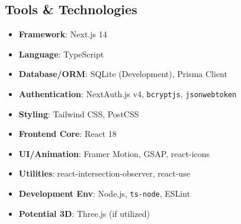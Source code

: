 \documentclass{article}
\begin{document}
\subsection{Tools \& Technologies}
\begin{itemize}[label=\textbullet]
    \item \textbf{Framework}: Next.js 14
    \item \textbf{Language}: TypeScript
    \item \textbf{Database/ORM}: SQLite (Development), Prisma Client
    \item \textbf{Authentication}: NextAuth.js v4, \texttt{bcryptjs}, \texttt{jsonwebtoken}
    \item \textbf{Styling}: Tailwind CSS, PostCSS
    \item \textbf{Frontend Core}: React 18
    \item \textbf{UI/Animation}: Framer Motion, GSAP, react-icons
    \item \textbf{Utilities}: react-intersection-observer, react-use
    \item \textbf{Development Env}: Node.js, \texttt{ts-node}, ESLint
    \item \textbf{Potential 3D}: Three.js (if utilized)
\end{itemize}
\end{document}
